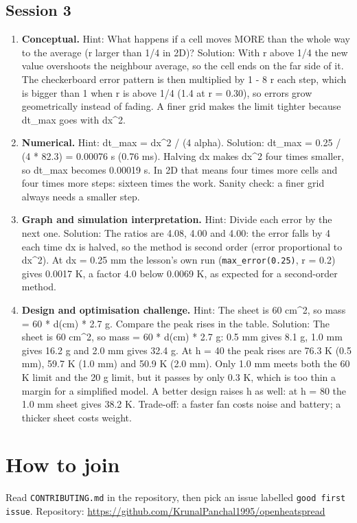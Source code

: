 \documentclass[11pt,a4paper]{article}
\begin{document}
\subsection*{Session 3}
\begin{enumerate}[nosep]
\item \textbf{Conceptual.} Hint: What happens if a cell moves MORE than the whole way to the average (r larger than 1/4 in 2D)? Solution: With r above 1/4 the new value overshoots the neighbour average, so the cell ends on the far side of it. The checkerboard error pattern is then multiplied by \textbar{}1 - 8 r\textbar{} each step, which is bigger than 1 when r is above 1/4 (1.4 at r = 0.30), so errors grow geometrically instead of fading. A finer grid makes the limit tighter because dt\_max goes with dx\textasciicircum{}2.
\item \textbf{Numerical.} Hint: dt\_max = dx\textasciicircum{}2 / (4 alpha). Solution: dt\_max = 0.25 / (4 * 82.3) = 0.00076 s (0.76 ms). Halving dx makes dx\textasciicircum{}2 four times smaller, so dt\_max becomes 0.00019 s. In 2D that means four times more cells and four times more steps: sixteen times the work. Sanity check: a finer grid always needs a smaller step.
\item \textbf{Graph and simulation interpretation.} Hint: Divide each error by the next one. Solution: The ratios are 4.08, 4.00 and 4.00: the error falls by 4 each time dx is halved, so the method is second order (error proportional to dx\textasciicircum{}2). At dx = 0.25 mm the lesson's own run (\texttt{max\_error(0.25)}, r = 0.2) gives 0.0017 K, a factor 4.0 below 0.0069 K, as expected for a second-order method.
\item \textbf{Design and optimisation challenge.} Hint: The sheet is 60 cm\textasciicircum{}2, so mass = 60 * d(cm) * 2.7 g. Compare the peak rises in the table. Solution: The sheet is 60 cm\textasciicircum{}2, so mass = 60 * d(cm) * 2.7 g: 0.5 mm gives 8.1 g, 1.0 mm gives 16.2 g and 2.0 mm gives 32.4 g. At h = 40 the peak rises are 76.3 K (0.5 mm), 59.7 K (1.0 mm) and 50.9 K (2.0 mm). Only 1.0 mm meets both the 60 K limit and the 20 g limit, but it passes by only 0.3 K, which is too thin a margin for a simplified model. A better design raises h as well: at h = 80 the 1.0 mm sheet gives 38.2 K. Trade-off: a faster fan costs noise and battery; a thicker sheet costs weight.
\end{enumerate}

\section{How to join}
Read \texttt{CONTRIBUTING.md} in the repository, then pick an issue labelled \texttt{good first issue}. Repository: \url{https://github.com/KrunalPanchal1995/openheatspread}
\end{document}
